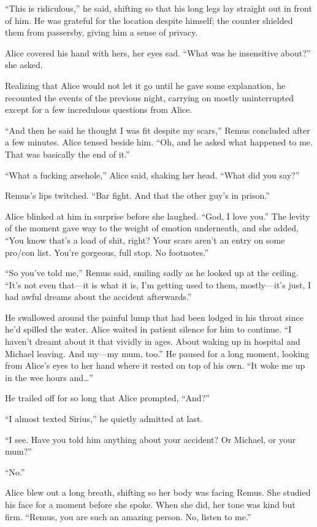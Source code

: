 “This is ridiculous,” he said, shifting so that his long legs lay straight out in front of him. He was grateful for the location despite himself; the counter shielded them from passersby, giving him a sense of privacy.

Alice covered his hand with hers, her eyes sad. “What was he insensitive about?” she asked.

Realizing that Alice would not let it go until he gave some explanation, he recounted the events of the previous night, carrying on mostly uninterrupted except for a few incredulous questions from Alice.

“And then he said he thought I was fit despite my scars,” Remus concluded after a few minutes. Alice tensed beside him. “Oh, and he asked what happened to me. That was basically the end of it.”

“What a fucking arsehole,” Alice said, shaking her head. “What did you say?”

Remus’s lips twitched. “Bar fight. And that the other guy’s in prison.”

Alice blinked at him in surprise before she laughed. “God, I love you.” The levity of the moment gave way to the weight of emotion underneath, and she added, “You know that’s a load of shit, right? Your scars aren’t an entry on some pro/con list. You’re gorgeous, full stop. No footnotes.”

“So you’ve told me,” Remus said, smiling sadly as he looked up at the ceiling. “It’s not even that—it is what it is, I’m getting used to them, mostly—it’s just, I had awful dreams about the accident afterwards.”

He swallowed around the painful lump that had been lodged in his throat since he’d spilled the water. Alice waited in patient silence for him to continue. “I haven’t dreamt about it that vividly in ages. About waking up in hospital and Michael leaving. And my—my mum, too.” He paused for a long moment, looking from Alice’s eyes to her hand where it rested on top of his own. “It woke me up in the wee hours and…”

He trailed off for so long that Alice prompted, “And?”

“I almost texted Sirius,” he quietly admitted at last.

“I see. Have you told him anything about your accident? Or Michael, or your mum?”

“No.”

Alice blew out a long breath, shifting so her body was facing Remus. She studied his face for a moment before she spoke. When she did, her tone was kind but firm. “Remus, you are such an amazing person. No, listen to me.”

